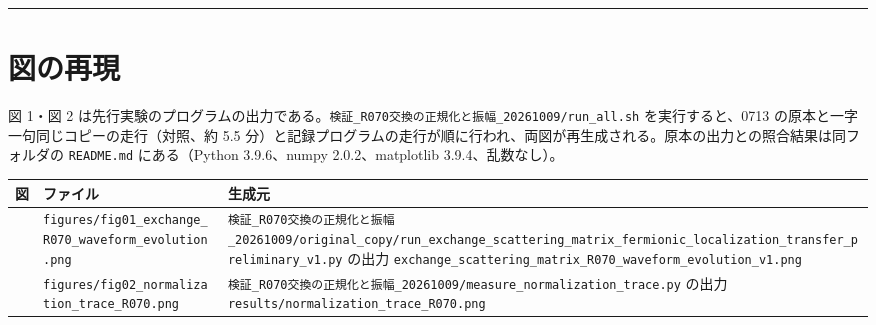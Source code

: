 \documentclass[
  a4paper,
]{ltjsarticle}
\newcounter{none} %
\begin{document}
\begin{center}\rule{0.5\linewidth}{0.5pt}\end{center}

\section{図の再現}\label{ux56f3ux306eux518dux73fe}

図 1・図 2
は先行実験のプログラムの出力である。\texttt{検証\_\allowbreak{}R070交換の正規化と振幅\_\allowbreak{}20261009/\allowbreak{}run\_\allowbreak{}all.sh}
を実行すると、0713 の原本と一字一句同じコピーの走行（対照、約 5.5
分）と記録プログラムの走行が順に行われ、両図が再生成される。原本の出力との照合結果は同フォルダの
\texttt{README.md} にある（Python 3.9.6、numpy 2.0.2、matplotlib
3.9.4、乱数なし）。

{\def\LTcaptype{none} %
\begin{longtable}[]{@{}
  >{\raggedright\arraybackslash}p{}
  >{\raggedright\arraybackslash}p{}
  >{\raggedright\arraybackslash}p{}@{}}
\toprule\noalign{}
\begin{minipage}[b]{\linewidth}\raggedright
図
\end{minipage} & \begin{minipage}[b]{\linewidth}\raggedright
ファイル
\end{minipage} & \begin{minipage}[b]{\linewidth}\raggedright
生成元
\end{minipage} \\
\midrule\noalign{}
\endhead
\bottomrule\noalign{}
\endlastfoot
1 & \texttt{figures/\allowbreak{}fig01\_\allowbreak{}exchange\_\allowbreak{}R070\_\allowbreak{}waveform\_\allowbreak{}evolution.png} &
\texttt{検証\_\allowbreak{}R070交換の正規化と振幅\_\allowbreak{}20261009/\allowbreak{}original\_\allowbreak{}copy/\allowbreak{}run\_\allowbreak{}exchange\_\allowbreak{}scattering\_\allowbreak{}matrix\_\allowbreak{}fermionic\_\allowbreak{}localization\_\allowbreak{}transfer\_\allowbreak{}preliminary\_\allowbreak{}v1.py}
の出力
\texttt{exchange\_\allowbreak{}scattering\_\allowbreak{}matrix\_\allowbreak{}R070\_\allowbreak{}waveform\_\allowbreak{}evolution\_\allowbreak{}v1.png} \\
2 & \texttt{figures/\allowbreak{}fig02\_\allowbreak{}normalization\_\allowbreak{}trace\_\allowbreak{}R070.png} &
\texttt{検証\_\allowbreak{}R070交換の正規化と振幅\_\allowbreak{}20261009/\allowbreak{}measure\_\allowbreak{}normalization\_\allowbreak{}trace.py}
の出力 \texttt{results/\allowbreak{}normalization\_\allowbreak{}trace\_\allowbreak{}R070.png} \\
\end{longtable}
}
\end{document}

